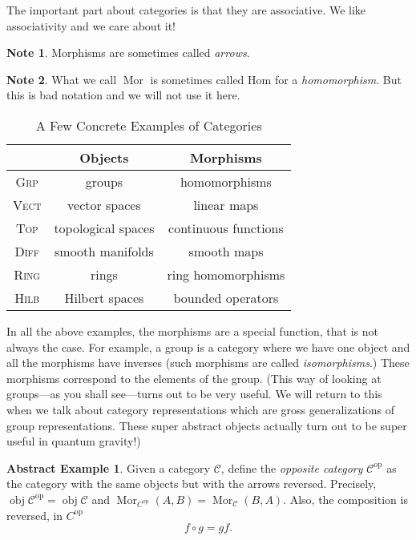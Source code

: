 \documentclass[english,12pt]{article}
\theoremstyle{definition}
\newtheorem{aexample}[theorem]{Abstract Example}
\newtheorem*{note}{Note}
\DeclareMathOperator{\obj}{obj}
\DeclareMathOperator{\Mor}{Mor}
\newcommand{\C}{\mathcal{C}}
\newcommand{\op}{\text{op}}
\begin{document}
The important part about categories is that they are associative. We like
associativity and we care about it!

\begin{note}
  Morphisms are sometimes called \emph{arrows}.
\end{note}

\begin{note}
  What we call $\Mor$ is sometimes called $\text{Hom}$ for a
  \emph{homomorphism}. But this is bad notation and we will not use it
  here.
\end{note}

\begin{table}[H]\label{tab:conc-examples}
  \centering
  \begin{tabular}{ccc}
    & Objects & Morphisms\\\hline
    \textsc{Grp}& groups & homomorphisms\\
    \textsc{Vect}& vector spaces & linear maps\\
     \textsc{Top}& topological spaces & continuous functions\\
    \textsc{Diff} & smooth manifolds & smooth maps\\
    \textsc{Ring} &rings & ring homomorphisms\\
    \textsc{Hilb} &Hilbert spaces & bounded operators\\[2mm]
  \end{tabular}
  \caption{A Few Concrete Examples of Categories}
\end{table}

In all the above examples, the morphisms are a special function, that is
not always the case. For example, a group is a category where we have one
object and all the morphisms have inverses (such morphisms are called
\emph{isomorphisms}.) These morphisms correspond to the elements of the
group. (This way of looking at groups---as you shall see---turns out to be
very useful. We will return to this when we talk about category
representations which are gross generalizations of group
representations. These super abstract objects actually turn out to be super
useful in quantum gravity!)

\begin{aexample}
  Given a category $\C$, define the \emph{opposite category} $\C^\op$ as
  the category with the same objects but with the arrows
  reversed. Precisely, $\obj \C^\op = \obj \C$ and $\Mor_{C^\op}(A,B) =
  \Mor_\C(B,A)$. Also, the composition is reversed, in $C^\op$
  \begin{equation}
    f \circ g = gf.
  \end{equation}
\end{aexample}
\end{document}
